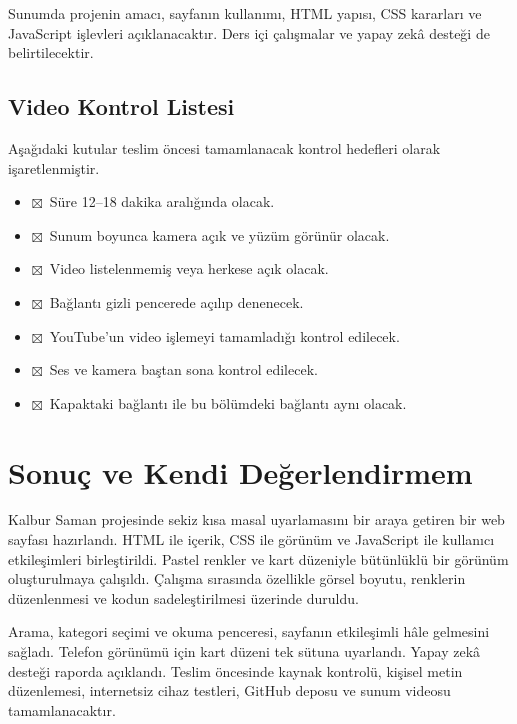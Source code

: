 \documentclass[12pt,a4paper]{article}
\newcommand{\tik}{$\boxtimes$}
\begin{document}
Sunumda projenin amacı, sayfanın kullanımı,
HTML yapısı, CSS kararları ve JavaScript
işlevleri açıklanacaktır. Ders içi çalışmalar
ve yapay zekâ desteği de belirtilecektir.

\subsection{Video Kontrol Listesi}

Aşağıdaki kutular teslim öncesi tamamlanacak
kontrol hedefleri olarak işaretlenmiştir.

\begin{itemize}[label={}]
\item \tik\ Süre 12--18 dakika aralığında olacak.
\item \tik\ Sunum boyunca kamera açık ve yüzüm görünür olacak.
\item \tik\ Video listelenmemiş veya herkese açık olacak.
\item \tik\ Bağlantı gizli pencerede açılıp denenecek.
\item \tik\ YouTube'un video işlemeyi tamamladığı kontrol edilecek.
\item \tik\ Ses ve kamera baştan sona kontrol edilecek.
\item \tik\ Kapaktaki bağlantı ile bu bölümdeki bağlantı aynı olacak.
\end{itemize}

\section{Sonuç ve Kendi Değerlendirmem}

Kalbur Saman projesinde sekiz kısa masal
uyarlamasını bir araya getiren bir web sayfası
hazırlandı. HTML ile içerik, CSS ile görünüm
ve JavaScript ile kullanıcı etkileşimleri
birleştirildi. Pastel renkler ve kart düzeniyle
bütünlüklü bir görünüm oluşturulmaya çalışıldı.
Çalışma sırasında özellikle görsel boyutu,
renklerin düzenlenmesi ve kodun sadeleştirilmesi
üzerinde duruldu.

Arama, kategori seçimi ve okuma penceresi,
sayfanın etkileşimli hâle gelmesini sağladı.
Telefon görünümü için kart düzeni tek sütuna
uyarlandı. Yapay zekâ desteği raporda açıklandı.
Teslim öncesinde kaynak kontrolü, kişisel metin
düzenlemesi, internetsiz cihaz testleri,
GitHub deposu ve sunum videosu tamamlanacaktır.

\end{document}
